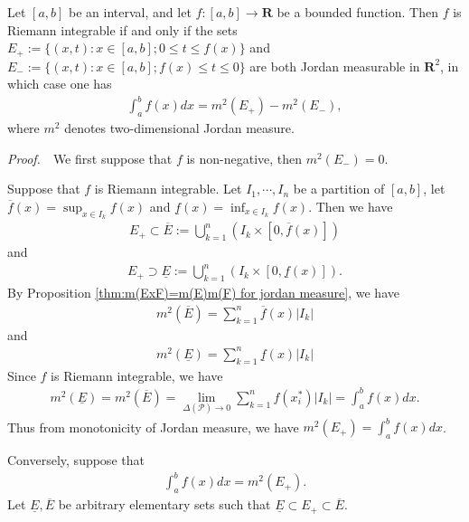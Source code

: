 \documentclass{book}
\theoremstyle{defstyle}
\theoremstyle{thmstyle}
\newcommand{\pff}{\noindent\emph{Proof.}~~}
\newcounter{Proposition}[section]
\begin{document}
\begin{proposition}
    Let $[a, b]$ be an interval, and let $f : [a, b] \to \mathbf{R}$ be a bounded function. Then $f$ is Riemann integrable if and only if the sets $E_+ := \{(x, t) : x \in [a, b]; 0 \leq t \leq f(x)\}$ and $E_- := \{(x, t) : x \in [a, b]; f(x) \leq t \leq 0\}$ are both Jordan measurable in $\mathbf{R}^2$, in which case one has
        \begin{align*}
            \int_{a}^{b}f(x)dx = m^2(E_+) - m^2(E_-),
        \end{align*}
    where $m^2$ denotes two-dimensional Jordan measure.
\end{proposition}

\pff We first suppose that $f$ is non-negative, then $m^2(E_-) = 0$.

Suppose that $f$ is Riemann integrable. Let $I_1, \cdots, I_n$ be a partition of $[a, b]$, let $\overline{f}(x) = \sup_{x \in I_k}f(x)$ and $\underline{f}(x) = \inf_{x \in I_k}f(x)$. Then we have
    \begin{align*}
        E_+
        \subset \overline{E}
            := \bigcup_{k = 1}^{n}(I_k \times [0, \overline{f}(x)])
    \end{align*}
and
    \begin{align*}
        E_+
        \supset \underline{E}
            := \bigcup_{k = 1}^{n}(I_k \times [0, \underline{f}(x)]).
    \end{align*}
By Proposition \ref{thm:m(ExF)=m(E)m(F) for jordan measure}, we have
    \begin{align*}
        m^2(\overline{E}) = \sum_{k = 1}^{n}\overline{f}(x)|I_k|
    \end{align*}
and
    \begin{align*}
        m^2(\underline{E}) = \sum_{k = 1}^{n}\underline{f}(x)|I_k|
    \end{align*}
Since $f$ is Riemann integrable, we have
    \begin{align*}
        m^2(\underline{E}) = m^2(\overline{E}) = \lim_{\Delta(\mathcal{P}) \to 0} \sum_{k = 1}^{n}f(x_i^*)|I_k| = \int_{a}^{b}f(x)dx.
    \end{align*}
Thus from monotonicity of Jordan measure, we have $m^2(E_+) = \int_{a}^{b}f(x)dx$.

Conversely, suppose that
    \begin{align*}
        \int_{a}^{b}f(x)dx = m^2(E_+).
    \end{align*}
Let $\underline{E}, \overline{E}$ be arbitrary elementary sets such that $\underline{E} \subset E_+ \subset \overline{E}$.
\end{document}
